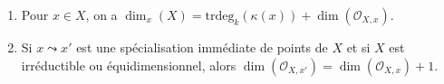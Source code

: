 \begin{lemma}
\begin{enumerate}
\begin{enumerate}
\item $\text{trdeg}_k(\kappa(x)) > \text{trdeg}_k(\kappa(x'))$, et
\item toute chaîne maximale de spécialisations non triviales
$x = x_0 \leadsto x_1 \leadsto \ldots \leadsto x_n = x'$ est de
longueur $n = \text{trdeg}_k(\kappa(x)) - \text{trdeg}_k(\kappa(x'))$.
\end{enumerate}
\item
\label{item-dimension-formula}
Pour $x \in X$, on a
$\dim_x(X) = \text{trdeg}_k(\kappa(x)) + \dim(\mathcal{O}_{X, x})$.
\item
\label{item-immediate-specialization-local-ring}
Si $x \leadsto x'$ est une spécialisation immédiate
de points de $X$ et si $X$ est irréductible ou équidimensionnel, alors
$\dim(\mathcal{O}_{X, x'}) = \dim(\mathcal{O}_{X, x}) + 1$.
\end{enumerate}
\end{lemma}


